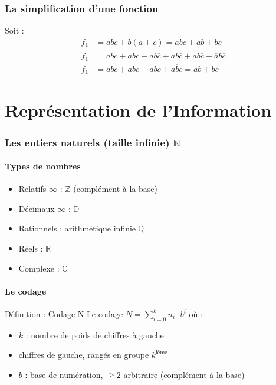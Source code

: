 \documentclass[a4paper,12pt]{article}
\begin{document}
\section{La simplification d'une fonction}

Soit :
\begin{align*}
f_1 &= abc + b(a+\overline{c}) = abc + ab + b\overline{c} \\
f_1 &= abc + abc + ab\overline{c} + ab\overline{c} + a\overline{b}\overline{c} + \overline{a}b\overline{c} \\
f_1 &= abc + ab\overline{c} + abc + a\overline{b}\overline{c} = ab + b\overline{c}
\end{align*}

\newpage


\part{Représentation de l'Information}

\section{Les entiers naturels (taille infinie) $\mathbb{N}$}

\subsection{Types de nombres}

\begin{itemize}
    \item Relatifs $\infty$ : $\mathbb{Z}$ (complément à la base)
    \item Décimaux $\infty$ : $\mathbb{D}$
    \item Rationnels : arithmétique infinie $\mathbb{Q}$
    \item Réels : $\mathbb{R}$
    \item Complexe : $\mathbb{C}$
\end{itemize}

\subsection{Le codage}

\begin{defbox}{Définition : Codage N}
Le codage $N = \sum_{i=0}^{k} n_i \cdot b^i$ où :
\begin{itemize}
    \item $k$ : nombre de poids de chiffres à gauche
    \item chiffres de gauche, rangés en groupe $k^{\text{ième}}$
    \item $b$ : base de numération, $\geq 2$ arbitraire (complément à la base)
\end{itemize}
\end{defbox}
\end{document}
